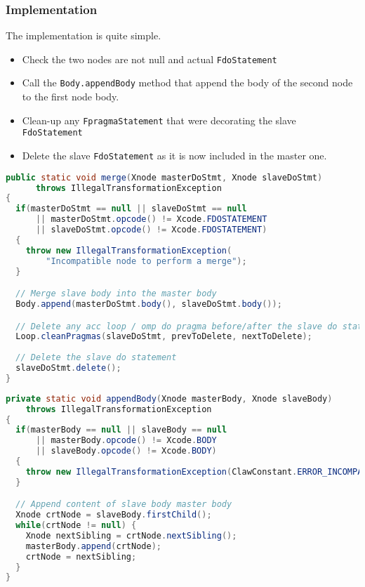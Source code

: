 \subsubsection{Implementation}
The implementation is quite simple.
\begin{itemize}
  \item Check the two nodes are not null and actual \lstinline|FdoStatement|
  \item Call the \lstinline|Body.appendBody| method that append the body of the
        second node to the first node body.
  \item Clean-up any \lstinline|FpragmaStatement| that were decorating the 
        slave \lstinline|FdoStatement|
  \item Delete the slave \lstinline|FdoStatement| as it is now included in the
        master one.
\end{itemize}

\begin{lstlisting}[label=lst:loop_merge, language=java, title=Loop.java]
public static void merge(Xnode masterDoStmt, Xnode slaveDoStmt)
      throws IllegalTransformationException
{
  if(masterDoStmt == null || slaveDoStmt == null
      || masterDoStmt.opcode() != Xcode.FDOSTATEMENT
      || slaveDoStmt.opcode() != Xcode.FDOSTATEMENT)
  {
    throw new IllegalTransformationException(
        "Incompatible node to perform a merge");
  }

  // Merge slave body into the master body
  Body.append(masterDoStmt.body(), slaveDoStmt.body());

  // Delete any acc loop / omp do pragma before/after the slave do statement.
  Loop.cleanPragmas(slaveDoStmt, prevToDelete, nextToDelete);
  
  // Delete the slave do statement
  slaveDoStmt.delete();
}
\end{lstlisting}


\begin{lstlisting}[label=lst:body_append, language=java, title=Body.java]
private static void appendBody(Xnode masterBody, Xnode slaveBody)
    throws IllegalTransformationException
{
  if(masterBody == null || slaveBody == null
      || masterBody.opcode() != Xcode.BODY
      || slaveBody.opcode() != Xcode.BODY)
  {
    throw new IllegalTransformationException(ClawConstant.ERROR_INCOMPATIBLE);
  }

  // Append content of slave body master body
  Xnode crtNode = slaveBody.firstChild();
  while(crtNode != null) {
    Xnode nextSibling = crtNode.nextSibling();
    masterBody.append(crtNode);
    crtNode = nextSibling;
  }
}
\end{lstlisting}

